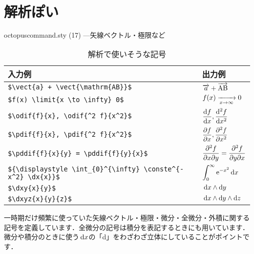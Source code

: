 \documentclass[uplatex]{jsreport}
\begin{document}
\section{解析ぽい}
\begin{insertcode}[firstnumber=234]{octopuscommand.sty (17) ---矢線ベクトル・極限など}
\newcommand{\vect}[1]{\overrightarrow{#1}}

\newcommand{\limit}[1]{\xrightarrow[#1]{}}
\newcommand{\odif}[2]{\dfrac{\mathrm{d}#1}{\mathrm{d}#2}}
\newcommand{\pdif}[2]{\dfrac{\partial #1}{\partial #2}}
\newcommand{\pddif}[3]{\dfrac{\partial^{2} #1}{\partial #2 \partial #3}}
\newcommand{\dx}[1]{\,\mathrm{d}#1}
\newcommand{\dxy}[2]{\,\mathrm{d}#1 \wedge \mathrm{d}#2}
\newcommand{\dxyz}[3]{\,\mathrm{d}#1 \wedge \mathrm{d}#2 \wedge \mathrm{d}#3}
\end{insertcode}
\begin{table}[htbp]
  \centering
  \caption{解析で使いそうな記号}
  \label{table:2.vectlimit}
  \renewcommand{\arraystretch}{1.5}
  \begin{tabular}{ll}\hline
    入力例 & 出力例 \\ \hline
    \verb|$\vect{a} + \vect{\mathrm{AB}}$| & $\vect{a} + \vect{\mathrm{AB}}$ \\
    \verb|$f(x) \limit{x \to \infty} 0$| & $f(x) \limit{x \to \infty} 0$ \\
    \verb|$\odif{f}{x}, \odif{^2 f}{x^2}$| & $\odif{f}{x}, \odif{^2 f}{x^2}$ \\
    \verb|$\pdif{f}{x}, \pdif{^2 f}{x^2}$| & $\pdif{f}{x}, \pdif{^2 f}{x^2}$ \\
    \verb|$\pddif{f}{x}{y} = \pddif{f}{y}{x}$| & $\pddif{f}{x}{y} = \pddif{f}{y}{x}$ \\
    \verb|${\displaystyle \int_{0}^{\infty} \conste^{-x^2} \dx{x}}$| & ${\displaystyle \int_{0}^{\infty} \conste^{-x^2} \dx{x}}$ \\
    \verb|$\dxy{x}{y}$| & $\dxy{x}{y}$ \\
    \verb|$\dxyz{x}{y}{z}$| & $\dxyz{x}{y}{z}$ \\ \hline
  \end{tabular}\par
\end{table}\par
一時期だけ頻繁に使っていた矢線ベクトル・極限・微分・全微分・外積に関する記号を定義しています．全微分の記号は積分を表記するときにも用いています．微分や積分のときに使う$\dx{x}$の「d」をわざわざ立体にしていることがポイントです．
\par
\end{document}
